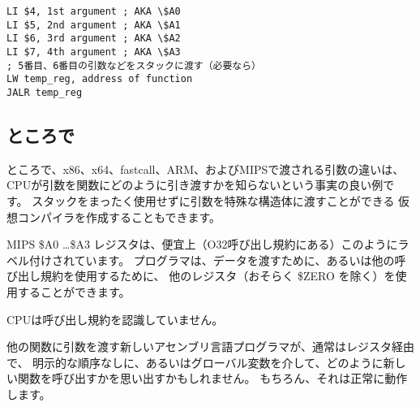 \begin{lstlisting}[caption=MIPS (O32 calling convention),style=customasmMIPS]
LI $4, 1st argument ; AKA \$A0
LI $5, 2nd argument ; AKA \$A1
LI $6, 3rd argument ; AKA \$A2
LI $7, 4th argument ; AKA \$A3
; 5番目、6番目の引数などをスタックに渡す（必要なら）
LW temp_reg, address of function
JALR temp_reg
\end{lstlisting}

\subsection{ところで}

ところで、x86、x64、fastcall、ARM、およびMIPSで渡される引数の違いは、
CPUが引数を関数にどのように引き渡すかを知らないという事実の良い例です。 
スタックをまったく使用せずに引数を特殊な構造体に渡すことができる
仮想コンパイラを作成することもできます。

MIPS \$A0 \dots \$A3 レジスタは、便宜上（O32呼び出し規約にある）このようにラベル付けされています。 
プログラマは、データを渡すために、あるいは他の呼び出し規約を使用するために、
他のレジスタ（おそらく \$ZERO を除く）を使用することができます。

\ac{CPU}は呼び出し規約を認識していません。

他の関数に引数を渡す新しいアセンブリ言語プログラマが、通常はレジスタ経由で、
明示的な順序なしに、あるいはグローバル変数を介して、どのように新しい関数を呼び出すかを思い出すかもしれません。 
もちろん、それは正常に動作します。
